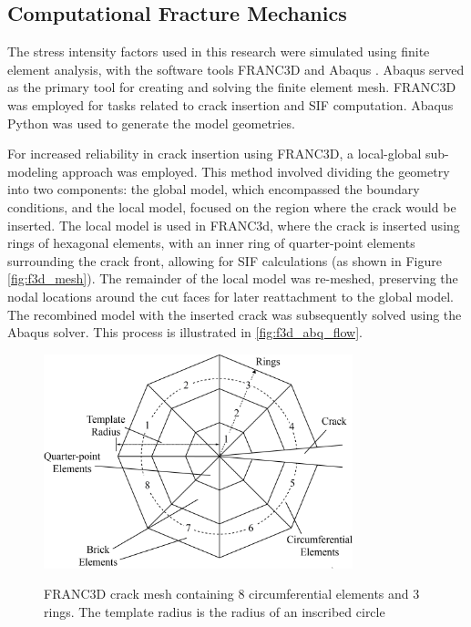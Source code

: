 \subsection{Computational Fracture Mechanics}

The stress intensity factors used in this research were simulated using finite element analysis, with the software tools FRANC3D and Abaqus \cite{f3d, Abaqus}. Abaqus served as the primary tool for creating and solving the finite element mesh. FRANC3D was employed for tasks related to crack insertion and SIF computation. Abaqus Python was used to generate the model geometries.

For increased reliability in crack insertion using FRANC3D, a local-global sub-modeling approach was employed. This method involved dividing the geometry into two components: the global model, which encompassed the boundary conditions, and the local model, focused on the region where the crack would be inserted. The local model is used in FRANC3d, where the crack is inserted using rings of hexagonal elements, with an inner ring of quarter-point elements surrounding the crack front, allowing for SIF calculations (as shown in Figure \ref{fig:f3d_mesh}). The remainder of the local model was re-meshed, preserving the nodal locations around the cut faces for later reattachment to the global model. The recombined model with the inserted crack was subsequently solved using the Abaqus solver. This process is illustrated in \ref{fig:f3d_abq_flow}.



\begin{figure}
  \centering
  \includegraphics[width=0.8\textwidth]{geometry_figures/f3d_crack.png}
  \label{fig:f3d_crack}
  \caption{FRANC3D crack mesh containing 8 circumferential elements and 3 rings. The template radius is the radius of an inscribed circle}
\end{figure}

